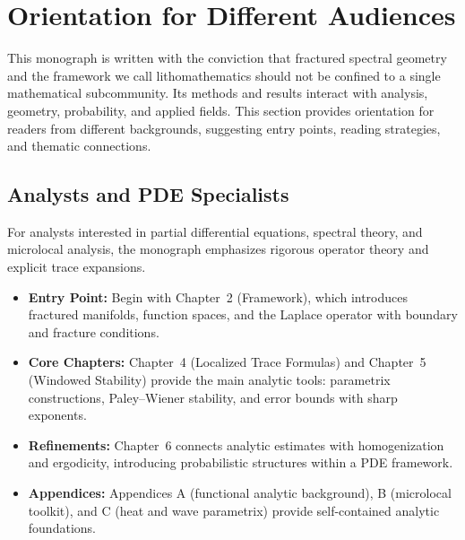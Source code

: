 
\section{Orientation for Different Audiences}

This monograph is written with the conviction that fractured spectral
geometry and the framework we call lithomathematics should not be
confined to a single mathematical subcommunity. Its methods and results
interact with analysis, geometry, probability, and applied fields. This
section provides orientation for readers from different backgrounds,
suggesting entry points, reading strategies, and thematic connections.

\subsection*{Analysts and PDE Specialists}

For analysts interested in partial differential equations, spectral
theory, and microlocal analysis, the monograph emphasizes rigorous
operator theory and explicit trace expansions.

\begin{itemize}
  \item \textbf{Entry Point:} Begin with Chapter~2 (Framework), which
  introduces fractured manifolds, function spaces, and the Laplace
  operator with boundary and fracture conditions.

  \item \textbf{Core Chapters:} Chapter~4 (Localized Trace Formulas) and
  Chapter~5 (Windowed Stability) provide the main analytic tools:
  parametrix constructions, Paley–Wiener stability, and error bounds
  with sharp exponents.

  \item \textbf{Refinements:} Chapter~6 connects analytic estimates with
  homogenization and ergodicity, introducing probabilistic structures
  within a PDE framework.

  \item \textbf{Appendices:} Appendices A (functional analytic
  background), B (microlocal toolkit), and C (heat and wave parametrix)
  provide self-contained analytic foundations.
\end{itemize}

